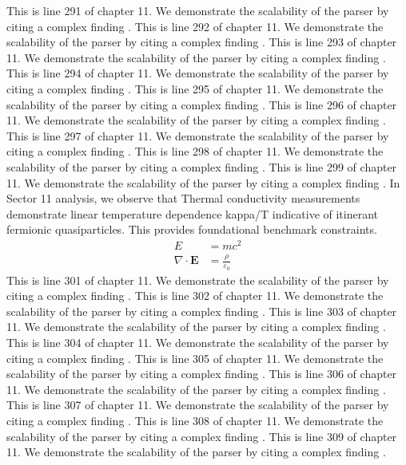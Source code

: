 This is line 291 of chapter 11. We demonstrate the scalability of the parser by citing a complex finding \cite{ref11_291}.
This is line 292 of chapter 11. We demonstrate the scalability of the parser by citing a complex finding \cite{ref11_292}.
This is line 293 of chapter 11. We demonstrate the scalability of the parser by citing a complex finding \cite{ref11_293}.
This is line 294 of chapter 11. We demonstrate the scalability of the parser by citing a complex finding \cite{ref11_294}.
This is line 295 of chapter 11. We demonstrate the scalability of the parser by citing a complex finding \cite{ref11_295}.
This is line 296 of chapter 11. We demonstrate the scalability of the parser by citing a complex finding \cite{ref11_296}.
This is line 297 of chapter 11. We demonstrate the scalability of the parser by citing a complex finding \cite{ref11_297}.
This is line 298 of chapter 11. We demonstrate the scalability of the parser by citing a complex finding \cite{ref11_298}.
This is line 299 of chapter 11. We demonstrate the scalability of the parser by citing a complex finding \cite{ref11_299}.
In Sector 11 analysis, we observe that Thermal conductivity measurements demonstrate linear temperature dependence kappa/T indicative of itinerant fermionic quasiparticles. This provides foundational benchmark constraints.
\begin{align*}
  E &= mc^2 \\
  \nabla \cdot \mathbf{E} &= \frac{\rho}{\varepsilon_0}
\end{align*}
This is line 301 of chapter 11. We demonstrate the scalability of the parser by citing a complex finding \cite{ref11_301}.
This is line 302 of chapter 11. We demonstrate the scalability of the parser by citing a complex finding \cite{ref11_302}.
This is line 303 of chapter 11. We demonstrate the scalability of the parser by citing a complex finding \cite{ref11_303}.
This is line 304 of chapter 11. We demonstrate the scalability of the parser by citing a complex finding \cite{ref11_304}.
This is line 305 of chapter 11. We demonstrate the scalability of the parser by citing a complex finding \cite{ref11_305}.
This is line 306 of chapter 11. We demonstrate the scalability of the parser by citing a complex finding \cite{ref11_306}.
This is line 307 of chapter 11. We demonstrate the scalability of the parser by citing a complex finding \cite{ref11_307}.
This is line 308 of chapter 11. We demonstrate the scalability of the parser by citing a complex finding \cite{ref11_308}.
This is line 309 of chapter 11. We demonstrate the scalability of the parser by citing a complex finding \cite{ref11_309}.
